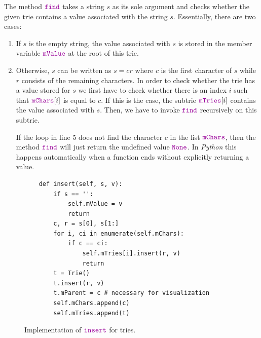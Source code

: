 The method $\mytt{find}$ takes a string $s$ as its sole argument and checks whether the given trie
contains a value associated with the string $s$.  Essentially, there are two cases:
\begin{enumerate}
\item If $s$ is the empty string, the value associated with $s$ is stored in the member variable
      $\mytt{mValue}$ at the root of this trie.
\item Otherwise, $s$ can be written as $s = cr$ where $c$ is the first character of $s$ while $r$
      consists of the remaining characters.  In order to check whether the trie has a value stored
      for $s$ we first have to check whether there is an index $i$ such that $\mytt{mChars}[i]$ is
      equal to $c$.  If this is the case, the subtrie $\mytt{mTries}[i]$ contains the value
      associated with $s$.  Then, we have to invoke $\mytt{find}$ recursively on this subtrie.

      If the loop in line 5 does not find the character $c$ in the list $\mytt{mChars}$, then the method
      $\mytt{find}$ will just return the undefined value $\mytt{None}$.  In \textsl{Python} this happens
      automatically when a function ends without explicitly returning a value.
\end{enumerate}


\begin{figure}[!ht]
\centering
\begin{verbatim}
    def insert(self, s, v):
        if s == '':
            self.mValue = v
            return
        c, r = s[0], s[1:]
        for i, ci in enumerate(self.mChars):
            if c == ci:
                self.mTries[i].insert(r, v)
                return
        t = Trie()
        t.insert(r, v)
        t.mParent = c # necessary for visualization
        self.mChars.append(c)
        self.mTries.append(t)
\end{verbatim}
\vspace*{-0.3cm}
\caption{Implementation of $\mytt{insert}$ for tries.}
\label{fig:trie.ipython-insert}
\end{figure}


